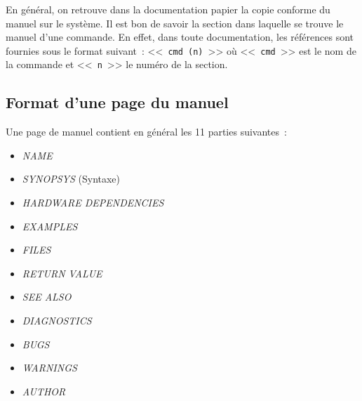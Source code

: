 En g{\'e}n{\'e}ral, on retrouve dans la documentation papier la copie
conforme du manuel sur le syst{\`e}me. Il est bon de savoir la section
dans laquelle se trouve le manuel d'une commande. En effet, dans toute
documentation, les r{\'e}f{\'e}rences sont fournies sous le format
suivant~: <<~{\tt cmd (n)}~>> o{\`u} <<~{\tt cmd}~>> est le nom de la
commande et <<~{\tt n}~>> le num{\'e}ro de la section.

\subsection{Format d'une page du manuel}

Une page de manuel contient en g{\'e}n{\'e}ral les 11
parties suivantes~:
\begin{itemize}
	\item {\sl NAME}
	\item {\sl SYNOPSYS} (Syntaxe)
	\item {\sl HARDWARE DEPENDENCIES}
	\item {\sl EXAMPLES}
	\item {\sl FILES}
	\item {\sl RETURN VALUE}
	\item {\sl SEE ALSO}
	\item {\sl DIAGNOSTICS}
	\item {\sl BUGS}
	\item {\sl WARNINGS}
	\item {\sl AUTHOR}
\end{itemize}

